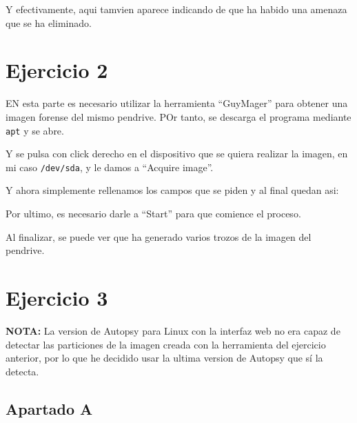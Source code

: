 \documentclass{article}
\begin{document}

Y efectivamente, aqui tamvien aparece indicando de que ha habido una amenaza que se ha eliminado.

\section*{Ejercicio 2}

EN esta parte es necesario utilizar la herramienta ``GuyMager'' para obtener una imagen forense del mismo pendrive. POr tanto, se descarga el programa mediante \verb|apt| y se abre.


Y se pulsa con click derecho en el dispositivo que se quiera realizar la imagen, en mi caso \verb|/dev/sda|, y le damos a ``Acquire image''.


Y ahora simplemente rellenamos los campos que se piden y al final quedan asi:


Por ultimo, es necesario darle a ``Start'' para que comience el proceso.


Al finalizar, se puede ver que ha generado varios trozos de la imagen del pendrive.


\section*{Ejercicio 3}

\textbf{NOTA: }La version de Autopsy para Linux con la interfaz web no era capaz de detectar las particiones de la imagen creada con la herramienta del ejercicio anterior, por lo que he decidido usar la ultima version de Autopsy que sí la detecta.

\subsection*{Apartado A}
\end{document}
